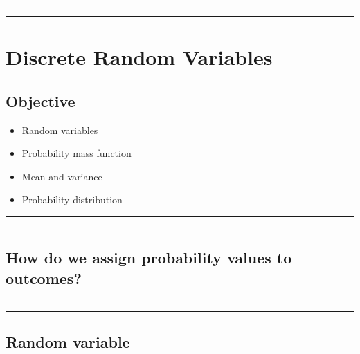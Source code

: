 \documentclass[
]{book}
\providecommand{\tightlist}{%
  \setlength{\itemsep}{0pt}\setlength{\parskip}{0pt}}
\begin{document}
\begin{center}\rule{0.5\linewidth}{0.5pt}\end{center}

\begin{center}\rule{0.5\linewidth}{0.5pt}\end{center}

\hypertarget{discrete-random-variables}{%
\chapter{Discrete Random Variables}\label{discrete-random-variables}}

\hypertarget{objective-3}{%
\section{Objective}\label{objective-3}}

\begin{itemize}
\tightlist
\item
  Random variables
\item
  Probability mass function
\item
  Mean and variance
\item
  Probability distribution
\end{itemize}

\begin{center}\rule{0.5\linewidth}{0.5pt}\end{center}

\begin{center}\rule{0.5\linewidth}{0.5pt}\end{center}

\hypertarget{how-do-we-assign-probability-values-to-outcomes}{%
\section{How do we assign probability values to outcomes?}\label{how-do-we-assign-probability-values-to-outcomes}}

\begin{center}\rule{0.5\linewidth}{0.5pt}\end{center}

\begin{center}\rule{0.5\linewidth}{0.5pt}\end{center}

\hypertarget{random-variable}{%
\section{Random variable}\label{random-variable}}
\end{document}
